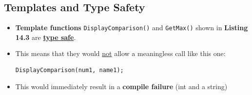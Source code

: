 \documentclass[10pt]{article}
\begin{document}
\newpage

\subsection{Templates and Type Safety}
\begin{itemize}
	\item \textbf{Template functions} \verb|DisplayComparison()| and \verb|GetMax()| shown in \textbf{Listing 14.3} are \underline{\textbf{type safe}}.

	\item This means that they would \underline{not} allow a meaningless call like this one:
		\begin{verbatim}
DisplayComparison(num1, name1);
		\end{verbatim}

	\item This would immediately result in a \textbf{compile failure} (int and a string)
\end{itemize}

\newpage 
\end{document}
